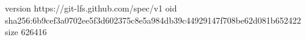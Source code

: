 version https://git-lfs.github.com/spec/v1
oid sha256:6b9cef3a0702ee5f3d602375c8e5a984db39c44929147f708be62d081b652422
size 626416
